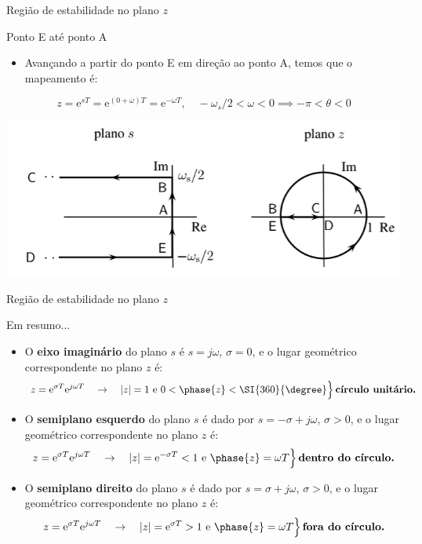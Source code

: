\begin{frame}{Região de estabilidade no plano $z$}
\begin{block}{Ponto E até ponto A}
\begin{itemize}
	\item Avançando a partir do ponto E em direção ao ponto A, temos que o mapeamento é:
\end{itemize}
$$z = \text{e}^{sT} = \text{e}^{(0+\omega)T} = \text{e}^{-\omega T}, \quad -\omega_s/2 < \omega < 0 \implies -\pi < \theta < 0$$
\end{block}
\centerline{\includegraphics[width=0.9\linewidth]{Figuras/Ch05/fig3.PNG}}
\end{frame}

\begin{frame}{Região de estabilidade no plano $z$}
\begin{block}{Em resumo...}
\begin{itemize}
	\item O \textbf{eixo imaginário} do plano $ s $ é $ s=j\omega $, $ \sigma=0 $, e o lugar geométrico correspondente no plano $ z $ é:
	\[ \left. z=\text{e}^{\sigma T}\text{e}^{j\omega T} \quad \rightarrow \quad |z|=1 \text{ e }0<\phase{z} < \SI{360}{\degree}\right\rbrace \text{\textbf{círculo unitário.}}\]
	\item O \textbf{semiplano esquerdo} do plano $ s $ é dado por $ s=-\sigma+j\omega $, $ \sigma >0 $, e o lugar geométrico correspondente no plano $ z $ é:
	\[ \left. z=\text{e}^{\sigma T}\text{e}^{j\omega T} \quad \rightarrow \quad |z|=\text{e}^{-\sigma T}<1 \text{ e }\phase{z}= \omega T \right\rbrace \text{\textbf{dentro do círculo.}}  \]
	\item O \textbf{semiplano direito} do plano $ s $ é dado por $ s=\sigma+j\omega $, $ \sigma>0 $, e o lugar geométrico correspondente no plano $ z $ é:
	\[ \left. z=\text{e}^{\sigma T}\text{e}^{j\omega T} \quad \rightarrow \quad |z|=\text{e}^{\sigma T}>1 \text{ e }\phase{z}= \omega T \right\rbrace \text{\textbf{fora do círculo.}} \]
\end{itemize}
\end{block}
\end{frame}


